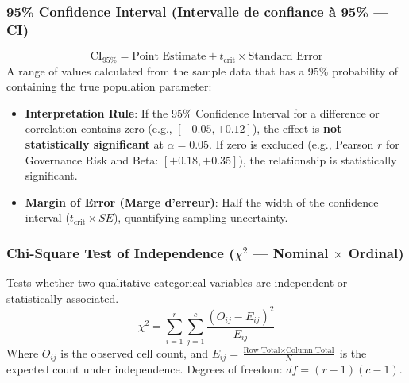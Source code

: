 \documentclass[
]{article}
\providecommand{\tightlist}{%
  \setlength{\itemsep}{0pt}\setlength{\parskip}{0pt}}
\begin{document}
\subsubsection{95\% Confidence Interval (Intervalle de confiance à 95\%
--- CI)}\label{confidence-interval-intervalle-de-confiance-uxe0-95-ci}

\[\text{CI}_{95\%} = \text{Point Estimate} \pm t_{\text{crit}} \times \text{Standard Error}\]
A range of values calculated from the sample data that has a 95\%
probability of containing the true population parameter:

\begin{itemize}
\tightlist
\item
  \textbf{Interpretation Rule}: If the 95\% Confidence Interval for a
  difference or correlation contains zero (e.g., \([-0.05, +0.12]\)),
  the effect is \textbf{not statistically significant} at
  \(\alpha = 0.05\). If zero is excluded (e.g., Pearson \(r\) for
  Governance Risk and Beta: \([+0.18, +0.35]\)), the relationship is
  statistically significant.
\item
  \textbf{Margin of Error (Marge d'erreur)}: Half the width of the
  confidence interval (\(t_{\text{crit}} \times SE\)), quantifying
  sampling uncertainty.
\end{itemize}

\subsubsection{\texorpdfstring{Chi-Square Test of Independence
(\(\chi^2\) --- Nominal \(\times\)
Ordinal)}{Chi-Square Test of Independence (\textbackslash chi\^{}2 --- Nominal \textbackslash times Ordinal)}}\label{chi-square-test-of-independence-chi2-nominal-times-ordinal}

Tests whether two qualitative categorical variables are independent or
statistically associated.
\[\chi^2 = \sum_{i=1}^r \sum_{j=1}^c \frac{(O_{ij} - E_{ij})^2}{E_{ij}}\]
Where \(O_{ij}\) is the observed cell count, and
\(E_{ij} = \frac{\text{Row Total} \times \text{Column Total}}{N}\) is
the expected count under independence. Degrees of freedom:
\(df = (r - 1)(c - 1)\).
\end{document}
